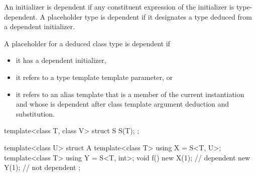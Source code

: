 \pnum
An initializer is dependent if
any constituent expression of the initializer
is type-dependent.
A placeholder type is dependent if
it designates a type deduced from a dependent initializer.

\pnum
A placeholder for a deduced class type
is dependent if
\begin{itemize}
\item
it has a dependent initializer,
\item
it refers to a type template template parameter, or
\item
it refers to an alias template
that is a member of the current instantiation and
whose  is dependent after
class template argument deduction
and substitution.
\end{itemize}

\pnum
\begin{example}
\begin{codeblock}
template<class T, class V>
struct S { S(T); };

template<class U>
struct A {
  template<class T> using X = S<T, U>;
  template<class T> using Y = S<T, int>;
  void f() {
    new X(1);                   // dependent
    new Y(1);                   // not dependent
  }
};
\end{codeblock}
\end{example}


